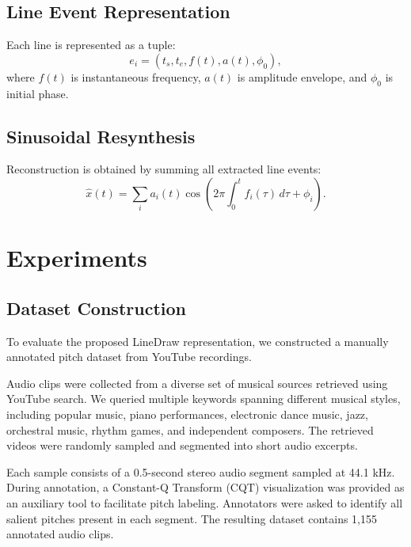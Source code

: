 \documentclass[11pt]{article}
\begin{document}
\subsection{Line Event Representation}
Each line is represented as a tuple:
\begin{equation}
e_i = (t_s, t_e, f(t), a(t), \phi_0),
\end{equation}
where $f(t)$ is instantaneous frequency, $a(t)$ is amplitude envelope, and $\phi_0$ is initial phase.

\subsection{Sinusoidal Resynthesis}
Reconstruction is obtained by summing all extracted line events:
\begin{equation}
\hat{x}(t) = \sum_i a_i(t)\cos\!\left(2\pi \int_0^t f_i(\tau)\,d\tau + \phi_i\right).
\end{equation}

\section{Experiments}

\subsection{Dataset Construction}

To evaluate the proposed LineDraw representation, we constructed a manually annotated pitch dataset from YouTube recordings.

Audio clips were collected from a diverse set of musical sources retrieved using YouTube search. We queried multiple keywords spanning different musical styles, including popular music, piano performances, electronic dance music, jazz, orchestral music, rhythm games, and independent composers. The retrieved videos were randomly sampled and segmented into short audio excerpts.

Each sample consists of a 0.5-second stereo audio segment sampled at 44.1 kHz. During annotation, a Constant-Q Transform (CQT) visualization was provided as an auxiliary tool to facilitate pitch labeling. Annotators were asked to identify all salient pitches present in each segment. The resulting dataset contains 1,155 annotated audio clips.
\end{document}

